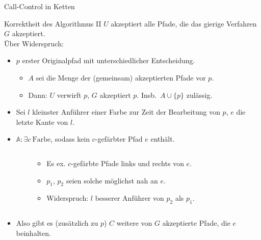 \begin{section}{Call-Control in Ketten}
\begin{frame}{Korrektheit des Algorithmus II}
	$U$ akzeptiert alle Pfade, die das gierige Verfahren $G$ akzeptiert.\\ Über Widerspruch:
	\begin{itemize}
		\pause\item $p$ erster Originalpfad mit unterschiedlicher Entscheidung.
		\begin{itemize}
			\pause\item $A$ sei die Menge der (gemeinsam) akzeptierten Pfade vor $p$.
			\pause\item Dann: $U$ verwirft $p$, $G$ akzeptiert $p$. Insb.\ $A \cup \{p\}$ zulässig.
		\end{itemize} 
		\pause\item Sei $l$ kleinster Anführer einer Farbe zur Zeit der Bearbeitung von $p$, $e$ die letzte Kante von $l$.
		\pause\item $\mathbb{A}: \exists c\ \text{Farbe}$, sodass kein $c$-gefärbter Pfad $e$ enthält.
			\vspace{-1em}
			\begin{columns}[T]
				\begin{column}{0.07\textwidth}
				\end{column}
				\begin{column}{0.45\textwidth}
					\begin{itemize}
						\item Es ex. $c$-gefärbte Pfade links und rechts von $e$.
						\vspace{-0.5em}
						\item $p_1$, $p_2$ seien solche möglichst nah an $e$.
						\vspace{-0.3em}
						\item Widerspruch: $l$ besserer Anführer von $p_2$ als $p_1$.
					\end{itemize}
				\end{column}
				\begin{column}{0.5\textwidth}
					\begin{figure}[htbp]
						\tiny
						\def\svgwidth{\textwidth}
						
					\end{figure}
				\end{column}
			\end{columns}
		\pause\item Also gibt es (zusätzlich zu $p$) $C$ weitere von $G$ akzeptierte Pfade, die $e$ beinhalten.
	\end{itemize}
\end{frame}


\end{section}
